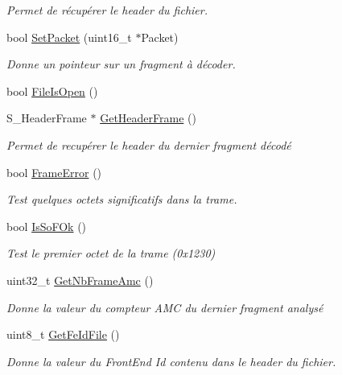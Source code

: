 \begin{DoxyCompactItemize}
\begin{DoxyCompactList}\small\item\em Permet de récupérer le header du fichier. \end{DoxyCompactList}\item 
bool \hyperlink{class_decode_frame_a84aaba0024f0e2c959c83db47a4e6cd1}{Set\+Packet} (uint16\+\_\+t $\ast$Packet)
\begin{DoxyCompactList}\small\item\em Donne un pointeur sur un fragment à décoder. \end{DoxyCompactList}\item 
bool \hyperlink{class_decode_frame_a5d8e060fc486a29d456973255c88e876}{File\+Is\+Open} ()
\item 
S\+\_\+\+Header\+Frame $\ast$ \hyperlink{class_decode_frame_a827eb5508bf71de0b80300e967ca4a94}{Get\+Header\+Frame} ()
\begin{DoxyCompactList}\small\item\em Permet de recupérer le header du dernier fragment décodé \end{DoxyCompactList}\item 
bool \hyperlink{class_decode_frame_a177c97af4a097447759fdbd28ef8d18a}{Frame\+Error} ()
\begin{DoxyCompactList}\small\item\em Test quelques octets significatifs dans la trame. \end{DoxyCompactList}\item 
bool \hyperlink{class_decode_frame_af2b5f1f869480dd72404b2fc3f1bac80}{Is\+So\+F\+Ok} ()
\begin{DoxyCompactList}\small\item\em Test le premier octet de la trame (0x1230) \end{DoxyCompactList}\item 
uint32\+\_\+t \hyperlink{class_decode_frame_a443f66af9144baf11fa5d5cd9c358729}{Get\+Nb\+Frame\+Amc} ()
\begin{DoxyCompactList}\small\item\em Donne la valeur du compteur A\+MC du dernier fragment analysé \end{DoxyCompactList}\item 
uint8\+\_\+t \hyperlink{class_decode_frame_a0e408e31eabbebea698d4f3122b79427}{Get\+Fe\+Id\+File} ()
\begin{DoxyCompactList}\small\item\em Donne la valeur du Front\+End Id contenu dans le header du fichier. \end{DoxyCompactList}\item 

\end{DoxyCompactItemize}
